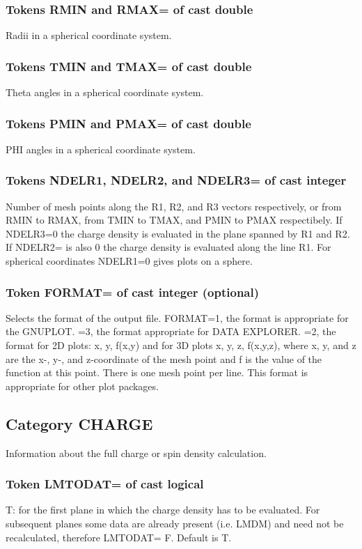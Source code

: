 \documentclass[aps,twocolumn,a4]{revtex4}
\begin{document}
\subsubsection{Tokens RMIN and RMAX= of cast double}
Radii in a spherical coordinate system.

\subsubsection{Tokens TMIN and TMAX= of cast double}
Theta angles in a spherical coordinate system.

\subsubsection{Tokens PMIN and PMAX= of cast double}
PHI angles in a spherical coordinate system.

\subsubsection{Tokens NDELR1, NDELR2, and NDELR3= of cast integer }
Number of mesh points along the R1, R2, and R3 vectors respectively, or
from RMIN to RMAX, from TMIN to TMAX, and PMIN to PMAX respectibely.
If NDELR3=0
the charge density is evaluated in the plane spanned by R1 and R2.
If NDELR2= is also 0
the charge density is evaluated along the line R1.
For spherical coordinates NDELR1=0 gives plots on a sphere.

\subsubsection{Token FORMAT= of cast integer (optional)}
Selects the format of the output file. FORMAT=1, the format is
appropriate for the GNUPLOT. =3, the format appropriate for DATA
EXPLORER. =2, the format for 2D plots: x, y, f(x,y) and for 3D plots
x, y, z, f(x,y,z), where x, y, and z are the x-, y-, and z-coordinate
of the mesh point and f is the value of the function at this point.
There is one mesh point per line.
This format is appropriate for other plot packages.

\subsection{Category CHARGE}
Information about the full charge or spin density calculation.

\subsubsection{Token LMTODAT= of cast logical}
T: for the first plane in which the charge density has to
be evaluated.  For subsequent planes some data are already present (i.e.
LMDM) and need not be recalculated, therefore LMTODAT= F.
Default is T.
\end{document}
